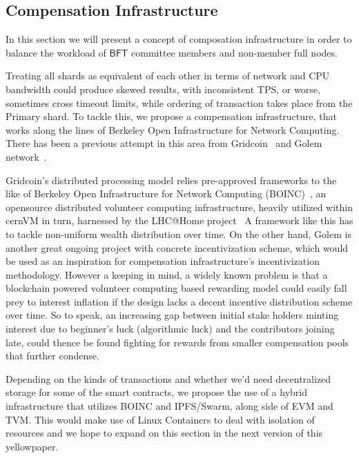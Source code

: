 \subsection{Compensation Infrastructure}

In this section we will present a concept of composation infrastructure in order to balance the workload of $\mathsf{BFT}$
committee members and non-member full nodes.

Treating all shards as equivalent of each other in terms of network and CPU bandwidth could produce skewed results,
with inconsistent TPS, or worse, sometimes cross timeout limits, while ordering of transaction takes place from the
Primary shard. To tackle this, we propose a compensation infrastructure, that works along the lines of Berkeley Open
Infrastructure for Network Computing. There has been a previous attempt in this area from Gridcoin~\cite{gridwhitepaper}
and Golem network~\cite{golemwhitepaper}.

Gridcoin's distributed processing model relies pre-approved frameworks to the like of Berkeley Open Infrastructure
for Network Computing (BOINC)~\cite{boincproject}, an opensource distributed volunteer computing infrastructure,
heavily utilized within cernVM\cite{cernvm} in turn, harnessed by the LHC@Home project~\cite{lhcathome}
A framework like this has to tackle non-uniform wealth distribution over time. On the other hand, Golem is another great
ongoing project with concrete incentivization scheme, which would be used as an inspiration for compensation infrastructure's
incentivization methodology. However a keeping in mind, a widely known problem is that a blockchain powered volunteer computing
based rewarding model could easily fall prey to interest inflation if the design lacks a decent incentive distribution scheme over time.
So to speak, an increasing gap between initial stake holders minting interest due to beginner's luck (algorithmic luck) and the contributors
joining late, could thence be found fighting for rewards from smaller compensation pools that further condense.

Depending on the kinds of transactions and whether we'd need decentralized storage for some of the smart contracts, we propose the use of
a hybrid infrastructure that utilizes BOINC and IPFS/Swarm, along side of EVM and TVM. This would make use of Linux Containers to deal with
isolation of resources and we hope to expand on this section in the next version of this yellowpaper.
